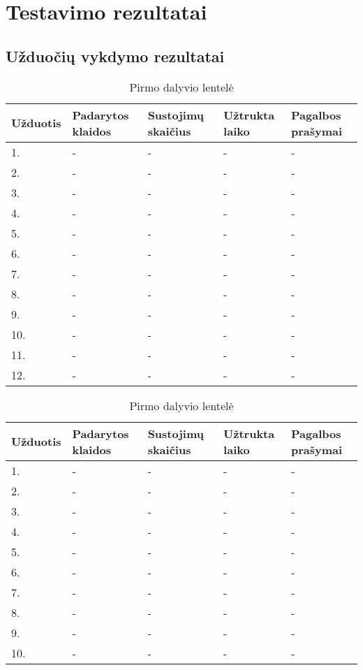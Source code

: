\documentclass[oneside]{VUMIFPSkursinis}
\begin{document}
\section{Testavimo rezultatai}
\subsection{Užduočių vykdymo rezultatai}
\begin{center}
	\begin{table}[!pht]
	\caption{Pirmo dalyvio lentelė}
	\begin{tabular}{ |p{1.8cm} | p{3.4cm} | p{3.4cm} | p{2.5cm} | p{3.5cm}|}
	\hline
	Užduotis&Padarytos klaidos&Sustojimų skaičius&Užtrukta laiko&Pagalbos prašymai\\ \hline
1.&-&-&-&- \\ \hline
2.&-&-&-&- \\ \hline
3.&-&-&-&- \\ \hline
4.&-&-&-&- \\ \hline
5.&-&-&-&- \\ \hline
6.&-&-&-&- \\ \hline
7.&-&-&-&- \\ \hline
8.&-&-&-&- \\ \hline
9.&-&-&-&- \\ \hline
10.&-&-&-&- \\ \hline
11.&-&-&-&- \\ \hline
12.&-&-&-&- \\ \hline
\end{tabular}
\end{table}
\vspace{0.7cm}
	\begin{table}[!pht]
	\caption{Pirmo dalyvio lentelė}
	\begin{tabular}{ |p{1.8cm} | p{3.4cm} | p{3.4cm} | p{2.5cm} | p{3.5cm}|}
	\hline
	Užduotis&Padarytos klaidos&Sustojimų skaičius&Užtrukta laiko&Pagalbos prašymai\\ \hline
1.&-&-&-&- \\ \hline
2.&-&-&-&- \\ \hline
3.&-&-&-&- \\ \hline
4.&-&-&-&- \\ \hline
5.&-&-&-&- \\ \hline
6.&-&-&-&- \\ \hline
7.&-&-&-&- \\ \hline
8.&-&-&-&- \\ \hline
9.&-&-&-&- \\ \hline
10.&-&-&-&- \\ \hline

\end{tabular}
\end{table}
\end{center}
\end{document}
